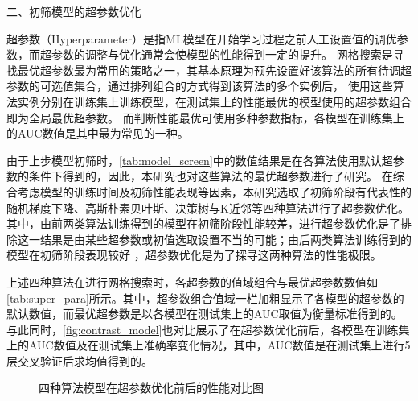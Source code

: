 二、初筛模型的超参数优化

超参数（Hyperparameter）是指ML模型在开始学习过程之前人工设置值的调优参数\cite{scikit-learn,Aurélien2018}，而超参数的调整与优化通常会使模型的性能得到一定的提升。
网格搜索是寻找最优超参数最为常用的策略之一，其基本原理为预先设置好该算法的所有待调超参数的可选值集合，通过排列组合的方式得到该算法的多个实例后，
使用这些算法实例分别在训练集上训练模型，在测试集上的性能最优的模型使用的超参数组合即为全局最优超参数\cite{Aurélien2018}。
而判断性能最优可使用多种参数指标，各模型在训练集上的AUC数值是其中最为常见的一种。

由于上步模型初筛时，\autoref{tab:model_screen}中的数值结果是在各算法使用默认超参数的条件下得到的，因此，本研究也对这些算法的最优超参数进行了研究。
在综合考虑模型的训练时间及初筛性能表现等因素，本研究选取了初筛阶段有代表性的随机梯度下降、高斯朴素贝叶斯、决策树与K近邻等四种算法进行了超参数优化。
其中，由前两类算法训练得到的模型在初筛阶段性能较差，进行超参数优化是了排除这一结果是由某些超参数或初值选取设置不当的可能；由后两类算法训练得到的模型在初筛阶段表现较好
，超参数优化是为了探寻这两种算法的性能极限。

上述四种算法在进行网格搜索时，各超参数的值域组合与最优超参数数值如\autoref{tab:super_para}所示。其中，超参数组合值域一栏加粗显示了各模型的超参数的默认数值，而最优超参数是以各模型在测试集上的AUC取值为衡量标准得到的。
与此同时，\autoref{fig:contrast_model}也对比展示了在超参数优化前后，各模型在训练集上的AUC数值及在测试集上准确率变化情况，其中，AUC数值是在测试集上进行5层交叉验证后求均值得到的。

\begin{figure}[htbp]
    \centering
    \quad
    \caption{\label{fig:contrast_model}四种算法模型在超参数优化前后的性能对比图}
\end{figure}

